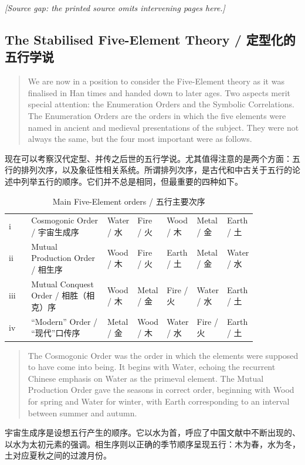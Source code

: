\documentclass[UTF8,zihao=-4]{ctexart}
\newenvironment{enblock}
  {\par\smallskip\noindent{\scriptsize\bfseries English}\par\begin{quote}\small}
  {\end{quote}}
\newenvironment{zhblock}
  {\par\noindent{\scriptsize\bfseries 中文}\par}
  {\par\medskip}
\newcommand{\gapnote}[1]{\par\smallskip\noindent\textit{[Source gap: #1]}\par\smallskip}
\begin{document}
\gapnote{the printed source omits intervening pages here.}

\subsection*{The Stabilised Five-Element Theory / 定型化的五行学说}

\begin{enblock}
We are now in a position to consider the Five-Element theory as it was finalised in Han times and handed down to later ages. Two aspects merit special attention: the Enumeration Orders and the Symbolic Correlations. The Enumeration Orders are the orders in which the five elements were named in ancient and medieval presentations of the subject. They were not always the same, but the four most important were as follows.
\end{enblock}
\begin{zhblock}
现在可以考察汉代定型、并传之后世的五行学说。尤其值得注意的是两个方面：五行的排列次序，以及象征性相关系统。所谓排列次序，是古代和中古关于五行的论述中列举五行的顺序。它们并不总是相同，但最重要的四种如下。
\end{zhblock}

\begin{longtable}{>{\raggedright\arraybackslash}p{0.1\linewidth}
                  >{\raggedright\arraybackslash}p{0.34\linewidth}
                  >{\centering\arraybackslash}p{0.08\linewidth}
                  >{\centering\arraybackslash}p{0.08\linewidth}
                  >{\centering\arraybackslash}p{0.08\linewidth}
                  >{\centering\arraybackslash}p{0.08\linewidth}
                  >{\centering\arraybackslash}p{0.08\linewidth}}
\caption{Main Five-Element orders / 五行主要次序}\\
\toprule
i & Cosmogonic Order / 宇宙生成序 & Water / 水 & Fire / 火 & Wood / 木 & Metal / 金 & Earth / 土\\
ii & Mutual Production Order / 相生序 & Wood / 木 & Fire / 火 & Earth / 土 & Metal / 金 & Water / 水\\
iii & Mutual Conquest Order / 相胜（相克）序 & Wood / 木 & Metal / 金 & Fire / 火 & Water / 水 & Earth / 土\\
iv & ``Modern'' Order / “现代”口传序 & Metal / 金 & Wood / 木 & Water / 水 & Fire / 火 & Earth / 土\\
\bottomrule
\end{longtable}

\begin{enblock}
The Cosmogonic Order was the order in which the elements were supposed to have come into being. It begins with Water, echoing the recurrent Chinese emphasis on Water as the primeval element. The Mutual Production Order gave the seasons in correct order, beginning with Wood for spring and Water for winter, with Earth corresponding to an interval between summer and autumn.
\end{enblock}
\begin{zhblock}
宇宙生成序是设想五行产生的顺序。它以水为首，呼应了中国文献中不断出现的、以水为太初元素的强调。相生序则以正确的季节顺序呈现五行：木为春，水为冬，土对应夏秋之间的过渡月份。
\end{zhblock}
\end{document}
